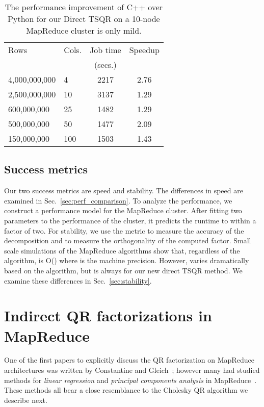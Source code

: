 \documentclass[10pt, conference, compsocconf]{IEEEtran}
\begin{document}
\begin{table}[tbp]
\vspace{-\baselineskip}
\centering
\caption{The performance improvement of C++ over Python for our  Direct TSQR on a 10-node MapReduce cluster is only mild.}
\begin{tabular}{l l @{\qquad} c c}
\toprule
Rows & Cols. & Job time & Speedup \\
           &            &  (secs.)   &                \\
\midrule
4,000,000,000 & 4     & 2217 & 2.76 \\
2,500,000,000 & 10   & 3137 & 1.29 \\
600,000,000    & 25   & 1482 & 1.29 \\
500,000,000    & 50   & 1477 & 2.09 \\
150,000,000    & 100 & 1503 & 1.43 \\
\bottomrule
\end{tabular}
\label{tab:perf_cxx}
\end{table}

\subsection{Success metrics}
Our two success metrics are speed and stability.  The differences in speed are examined in Sec.~\ref{sec:perf_comparison}.  To analyze the performance, we construct a performance model for the MapReduce cluster.  After fitting two parameters to the performance of the cluster, it predicts the runtime to within a factor of two.  For stability, we use the metric  to measure the accuracy of the decomposition and  to measure the orthogonality of the computed  factor.  Small scale simulations of the MapReduce algorithms show that, regardless of the algorithm,  is O() where  is the machine precision.  However,  varies dramatically based on the algorithm, but is always  for our new direct TSQR method.  We examine these differences in Sec.~\ref{sec:stability}.




\section{Indirect QR factorizations in MapReduce}\label{sec:indirect_QR}

One of the first papers to explicitly discuss the QR factorization on MapReduce architectures was written by Constantine and Gleich~\cite{Constantine-2011-TSQR-MapReduce}; however many had studied methods for \emph{linear regression} and \emph{principal components analysis} in MapReduce~\cite{Chu-2006-MapReduce}.  These methods all bear a close resemblance to the Cholesky QR algorithm we describe next.
\end{document}
